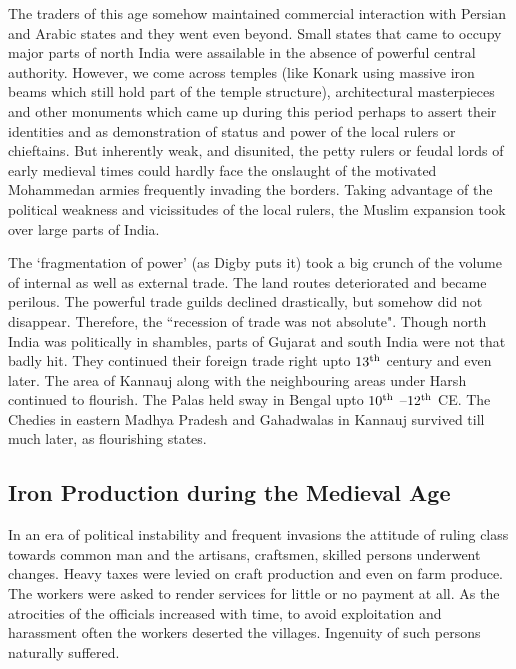 The traders of this age somehow maintained commercial interaction with Persian and Arabic states and they went even beyond. Small states that came to occupy major parts of north India were assailable in the absence of powerful central authority. However, we come across temples (like Konark using massive iron beams which still hold part of the temple structure), architectural masterpieces and other monuments which came up during this period perhaps to assert their identities and as demonstration of status and power of the local rulers or chieftains. But inherently weak, and disunited, the petty rulers or feudal lords of early medieval times could hardly face the onslaught of the motivated Mohammedan armies frequently invading the borders. Taking advantage of the political weakness and vicissitudes of the local rulers, the Muslim expansion took over large parts of India. 

The `fragmentation of power' (as Digby puts it) took a big crunch of the volume of internal as well as external trade. The land routes deteriorated and became perilous. The powerful trade guilds declined drastically, but somehow did not disappear. Therefore, the ``recession of trade was not absolute". Though north India was politically in shambles, parts of Gujarat and south India were not that badly hit. They continued their foreign trade right upto $13^{\rm th}$ century and even later. The area of Kannauj along with the neighbouring areas under Harsh continued to flourish. The Palas held sway in Bengal upto $10^{\rm th}$ –$12^{\rm th}$ CE. The Chedies in eastern Madhya Pradesh and Gahadwalas in Kannauj survived till much later, as flourishing states.

\vspace{-.3cm}

\subsection*{Iron Production during the Medieval Age}\label{chapter8-subsection-3}

\vspace{-.2cm}

In an era of political instability and frequent invasions the attitude of ruling class towards common man and the artisans, craftsmen, skilled persons underwent changes. Heavy taxes were levied on craft production and even on farm produce. The workers were asked to render services for little or no payment at all. As the atrocities of the officials increased with time, to avoid exploitation and harassment often the workers deserted the villages. Ingenuity of such persons naturally suffered. 

